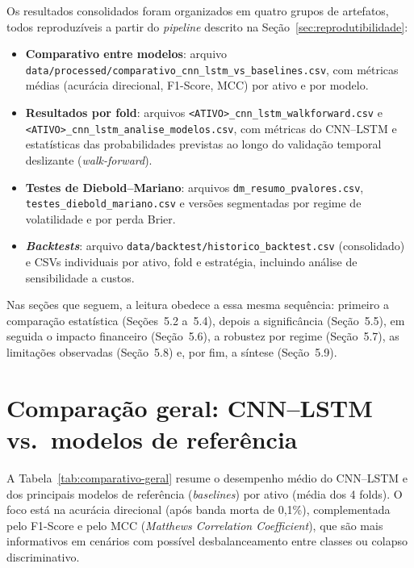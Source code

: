 Os resultados consolidados foram organizados em quatro grupos de artefatos, todos
reproduzíveis a partir do \textit{pipeline} descrito na Seção~\ref{sec:reprodutibilidade}:

\begin{itemize}
  \item \textbf{Comparativo entre modelos}: arquivo
  \texttt{data/processed/comparativo\_cnn\_lstm\_vs\_baselines.csv}, com métricas médias
  (acurácia direcional, F1-Score, MCC) por ativo e por modelo.
  \item \textbf{Resultados por fold}: arquivos
  \texttt{<ATIVO>\_cnn\_lstm\_walkforward.csv} e
  \texttt{<ATIVO>\_cnn\_lstm\_analise\_modelos.csv},
  com métricas do CNN--LSTM e estatísticas das probabilidades previstas ao longo do validação temporal deslizante (\textit{walk-forward}).
  \item \textbf{Testes de Diebold--Mariano}: arquivos
  \texttt{dm\_resumo\_pvalores.csv},
  \texttt{testes\_diebold\_mariano.csv} e versões segmentadas por regime de volatilidade e por perda Brier.
  \item \textbf{\textit{Backtests}}: arquivo
  \texttt{data/backtest/historico\_backtest.csv} (consolidado) e CSVs individuais por ativo, fold e estratégia,
  incluindo análise de sensibilidade a custos.
\end{itemize}

Nas seções que seguem, a leitura obedece a essa mesma sequência: primeiro a comparação
estatística (Seções~5.2 a~5.4), depois a significância (Seção~5.5), em seguida o impacto
financeiro (Seção~5.6), a robustez por regime (Seção~5.7), as limitações observadas (Seção~5.8)
e, por fim, a síntese (Seção~5.9).

\section{Comparação geral: CNN--LSTM vs.\ modelos de referência}
\label{sec:comparacao-geral}

A Tabela~\ref{tab:comparativo-geral} resume o desempenho médio do CNN--LSTM e dos principais
modelos de referência (\textit{baselines}) por ativo (média dos 4 folds). O foco está na acurácia direcional
(após banda morta de 0,1\%), complementada pelo F1-Score e pelo MCC (\emph{Matthews Correlation
Coefficient}), que são mais informativos em cenários com possível desbalanceamento entre classes
ou colapso discriminativo.


